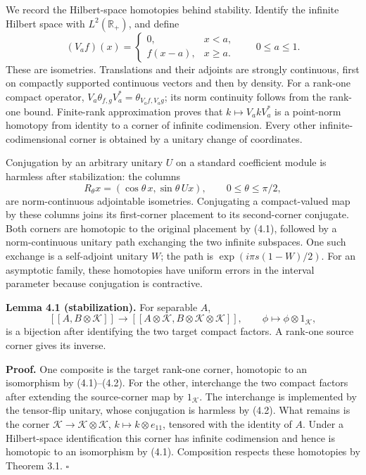 \documentclass[
  11pt,
]{article}
\begin{document}
We record the Hilbert-space homotopies behind stability. Identify the
infinite Hilbert space with \(L^2(\mathbb R_+)\), and define \[
(V_af)(x)=\begin{cases}0,&x<a,\\ f(x-a),&x\geq a.\end{cases}
\qquad 0\leq a\leq1.
\tag{4.1}
\] These are isometries. Translations and their adjoints are strongly
continuous, first on compactly supported continuous vectors and then by
density. For a rank-one compact operator,
\(V_a\theta_{f,g}V_a^*=\theta_{V_af,V_ag}\); its norm continuity follows
from the rank-one bound. Finite-rank approximation proves that
\(k\mapsto V_akV_a^*\) is a point-norm homotopy from identity to a
corner of infinite codimension. Every other infinite-codimensional
corner is obtained by a unitary change of coordinates.

Conjugation by an arbitrary unitary \(U\) on a standard coefficient
module is harmless after stabilization: the columns \[
R_\theta x=(\cos\theta\,x,\sin\theta\,Ux),\qquad
0\leq\theta\leq\pi/2,
\tag{4.2}
\] are norm-continuous adjointable isometries. Conjugating a
compact-valued map by these columns joins its first-corner placement to
its second-corner conjugate. Both corners are homotopic to the original
placement by (4.1), followed by a norm-continuous unitary path
exchanging the two infinite subspaces. One such exchange is a
self-adjoint unitary \(W\); the path is \(\exp(i\pi s(1-W)/2)\). For an
asymptotic family, these homotopies have uniform errors in the interval
parameter because conjugation is contractive.

\textbf{Lemma 4.1 (stabilization).} For separable \(A\), \[
[[A,B\otimes\mathcal K]]\longrightarrow
[[A\otimes\mathcal K,B\otimes\mathcal K\otimes\mathcal K]],
\qquad \phi\longmapsto\phi\otimes1_{\mathcal K},
\tag{4.3}
\] is a bijection after identifying the two target compact factors. A
rank-one source corner gives its inverse.

\textbf{Proof.} One composite is the target rank-one corner, homotopic
to an isomorphism by (4.1)--(4.2). For the other, interchange the two
compact factors after extending the source-corner map by
\(1_{\mathcal K}\). The interchange is implemented by the tensor-flip
unitary, whose conjugation is harmless by (4.2). What remains is the
corner \(\mathcal K\to\mathcal K\otimes\mathcal K\),
\(k\mapsto k\otimes e_{11}\), tensored with the identity of \(A\). Under
a Hilbert-space identification this corner has infinite codimension and
hence is homotopic to an isomorphism by (4.1). Composition respects
these homotopies by Theorem 3.1. \(\square\)
\end{document}
